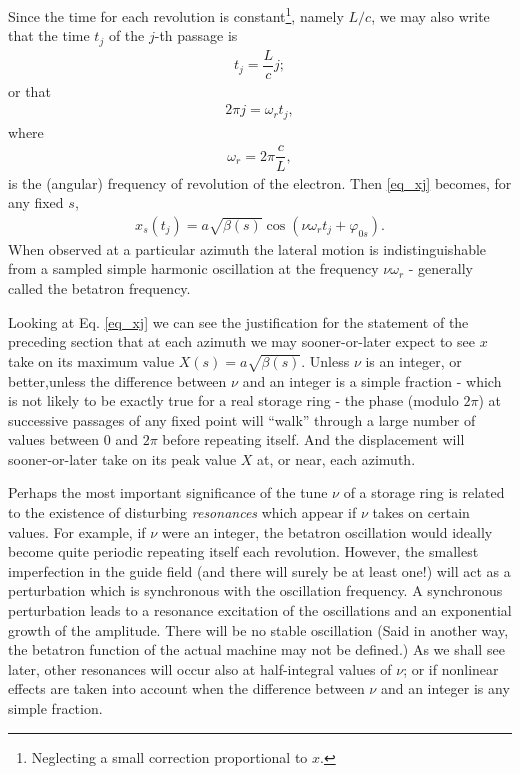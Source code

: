 \documentclass[../sands-adaptation.tex]{subfiles}
\begin{document}
Since the time for each revolution is constant\footnote{Neglecting a small correction proportional to $x$.}, namely $L/c$, we may also write that the time $t_j$ of the $j$-th passage is
\begin{align*}
	t_j = \dfrac{L}{c}j;
\end{align*}
or that
\begin{align}
	2\pi j = \omega_r t_j,
\end{align}
where
\begin{align}
	\omega_r = 2\pi \dfrac{c}{L},
\end{align}
is the (angular) frequency of revolution of the electron. Then \eqref{eq_xj} becomes, for any fixed $s$,
\begin{align}
	x_s(t_j) = a \sqrt{\beta(s)}\cos(\nu \omega_r t_j + \varphi_{0s}).
\end{align}
When observed at a particular azimuth the lateral motion is indistinguishable from a sampled simple harmonic oscillation  at the frequency $\nu \omega_r$ - generally called the betatron frequency.

Looking at Eq. \eqref{eq_xj} we can see the justification for the statement of the preceding section that at each azimuth we may sooner-or-later expect to see $x$ take on its maximum value $X(s)=a\sqrt{\beta(s)}$. Unless $\nu$ is an integer, or better,unless the difference between $\nu$ and an integer is a simple fraction - which is not likely to be exactly true for a real storage ring - the phase (modulo $2\pi$) at successive passages of any fixed point will ``walk'' through a large number of values between $0$ and $2\pi$ before repeating itself. And the displacement will sooner-or-later take on its peak value $X$ at, or near, each azimuth.

Perhaps the most important significance of the tune $\nu$ of a storage ring is related to the existence of disturbing \textit{resonances} which appear if $\nu$ takes on certain values. For example, if $\nu$ were an integer, the betatron oscillation would ideally become quite periodic repeating itself each revolution. However, the smallest imperfection in the guide field (and there will surely be at least one!) will act as a perturbation which is synchronous with the oscillation frequency. A synchronous perturbation leads to a resonance excitation of the oscillations and an exponential growth of the amplitude.  There will be no stable oscillation (Said in another way, the betatron function of the actual machine may not be defined.) As we shall see later, other resonances will occur also at half-integral values of $\nu$; or if nonlinear effects are taken into account when the difference between $\nu$ and an integer is any simple fraction.
\end{document}
